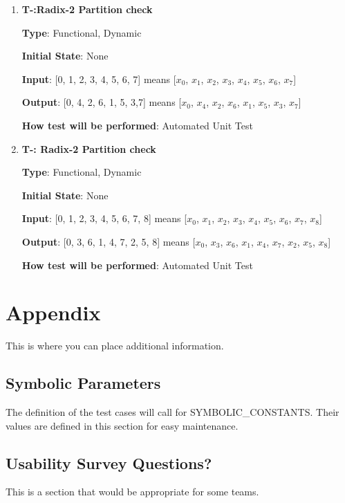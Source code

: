 \documentclass[12pt, titlepage]{article}
\newcounter{tnum}
\begin{document}
\begin{enumerate}

\item{\textbf{T-\thetnum \label{R2P}:Radix-2 Partition check}}

\textbf {Type}: Functional, Dynamic
					
\textbf {Initial State}: None
					
\textbf {Input}: [0, 1, 2, 3, 4, 5, 6, 7] means [$x_0$, $x_1$, $x_2$, $x_3$, $x_4$, $x_5$, $x_6$, $x_7$]
					
\textbf {Output}: [0, 4, 2, 6, 1, 5, 3,7] means [$x_0$, $x_4$, $x_2$, $x_6$, $x_1$, $x_5$, $x_3$, $x_7$]
					
\textbf {How test will be performed}: Automated Unit Test


\item{\textbf{T-\thetnum \label{R3P}: Radix-2 Partition check}}

\textbf {Type}: Functional, Dynamic
					
\textbf {Initial State}: None
					
\textbf {Input}: [0, 1, 2, 3, 4, 5, 6, 7, 8] means [$x_0$, $x_1$, $x_2$, $x_3$, $x_4$, $x_5$, $x_6$, $x_7$, $x_8$]
					
\textbf {Output}: [0, 3, 6, 1, 4, 7, 2, 5, 8] means [$x_0$, $x_3$, $x_6$, $x_1$, $x_4$, $x_7$, $x_2$, $x_5$, $x_8$]
					
\textbf {How test will be performed}:  Automated Unit Test

\end{enumerate}	






\newpage

\section{Appendix}

This is where you can place additional information.

\subsection{Symbolic Parameters}

The definition of the test cases will call for SYMBOLIC\_CONSTANTS.
Their values are defined in this section for easy maintenance.

\subsection{Usability Survey Questions?}

This is a section that would be appropriate for some teams.
\end{document}
